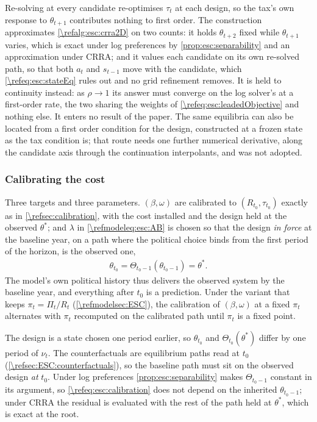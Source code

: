 Re-solving at every candidate re-optimises $\tau_t$ at each design, so the tax's own response to $\theta_{t+1}$ contributes nothing to first order. The construction approximates \cref{\refalg:esc:crra2D} on two counts: it holds $\theta_{t+2}$ fixed while $\theta_{t+1}$ varies, which is exact under log preferences by \cref{prop:esc:separability} and an approximation under CRRA; and it values each candidate on its own re-solved path, so that both $a_t$ and $s_{t-1}$ move with the candidate, which \eqref{\refeq:esc:stateEq} rules out and no grid refinement removes. It is held to continuity instead: as $\rho\rightarrow1$ its answer must converge on the log solver's at a first-order rate, the two sharing the weights of \eqref{\refeq:esc:leadedObjective} and nothing else. It enters no result of the paper. The same equilibria can also be located from a first order condition for the design, constructed at a frozen state as the tax condition is; that route needs one further numerical derivative, along the candidate axis through the continuation interpolants, and was not adopted.


\subsubsection{Calibrating the cost}\label{\refsec:ESC:calibration}
Three targets and three parameters. $\left(\beta,\omega\right)$ are calibrated to $\left(R_{t_0},\tau_{t_0}\right)$ exactly as in \cref{\refsec:calibration}, with the cost installed and the design held at the observed $\theta^{\ast}$; and $\lambda$ in \eqref{\refmodeleq:esc:AB} is chosen so that the design \emph{in force} at the baseline year, on a path where the political choice binds from the first period of the horizon, is the observed one,
\begin{align}\label{\refeq:esc:calibration}
    \theta_{t_0} = \Theta_{t_0-1}\left(\theta_{t_0-1}\right) = \theta^{\ast}.
\end{align}
The model's own political history thus delivers the observed system by the baseline year, and everything after $t_0$ is a prediction. Under the variant that keeps $\pi_t = \Pi_t/R_t$ (\cref{\refmodelsec:ESC}), the calibration of $\left(\beta,\omega\right)$ at a fixed $\pi_t$ alternates with $\pi_t$ recomputed on the calibrated path until $\pi_t$ is a fixed point.

 The design is a state chosen one period earlier, so $\theta_{t_0}$ and $\Theta_{t_0}(\theta^{\ast})$ differ by one period of $\nu_t$. The counterfactuals are equilibrium paths read at $t_0$ (\cref{\refsec:ESC:counterfactuals}), so the baseline path must sit on the observed design \emph{at} $t_0$. Under log preferences \cref{prop:esc:separability} makes $\Theta_{t_0-1}$ constant in its argument, so \eqref{\refeq:esc:calibration} does not depend on the inherited $\theta_{t_0-1}$; under CRRA the residual is evaluated with the rest of the path held at $\theta^{\ast}$, which is exact at the root.

